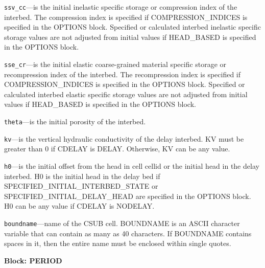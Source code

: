 \begin{description}
\item \texttt{ssv\_cc}---is the initial inelastic specific storage or compression index of the interbed. The compression index is specified if COMPRESSION\_INDICES is specified in the OPTIONS block. Specified or calculated interbed inelastic specific storage values are not adjusted from initial values if HEAD\_BASED is specified in the OPTIONS block.

\item \texttt{sse\_cr}---is the initial elastic coarse-grained material specific storage or recompression index of the interbed. The recompression index is specified if COMPRESSION\_INDICES is specified in the OPTIONS block. Specified or calculated interbed elastic specific storage values are not adjusted from initial values if HEAD\_BASED is specified in the OPTIONS block.

\item \texttt{theta}---is the initial porosity of the interbed.

\item \texttt{kv}---is the vertical hydraulic conductivity of the delay interbed. KV must be greater than 0 if CDELAY is DELAY. Otherwise, KV can be any value.

\item \texttt{h0}---is the initial offset from the head in cell cellid or the initial head in the delay interbed. H0 is the initial head in the delay bed if SPECIFIED\_INITIAL\_INTERBED\_STATE or SPECIFIED\_INITIAL\_DELAY\_HEAD are specified in the OPTIONS block. H0 can be any value if CDELAY is NODELAY.

\item \texttt{boundname}---name of the CSUB cell.  BOUNDNAME is an ASCII character variable that can contain as many as 40 characters.  If BOUNDNAME contains spaces in it, then the entire name must be enclosed within single quotes.

\end{description}
\item \textbf{Block: PERIOD}

